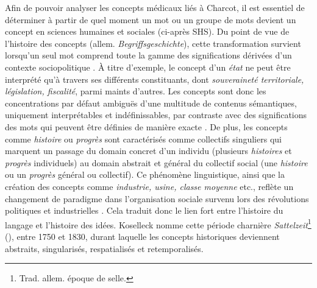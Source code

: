 Afin de pouvoir analyser les concepts médicaux liés à Charcot, il est essentiel de déterminer à partir de quel moment un mot ou un groupe de mots devient un concept en sciences humaines et sociales (ci-après SHS). Du point de vue de l'histoire des concepts (allem. \textit{Begriffsgeschichte}), cette transformation survient lorsqu'un seul mot comprend toute la gamme des significations dérivées d'un contexte sociopolitique \citep[p. 258]{koselleck2011introduction}. À titre d'exemple, le concept d'un \textit{état} ne peut être interprété qu'à travers ses différents constituants, dont \textit{souveraineté territoriale, législation, fiscalité}, parmi maints d'autres. Les concepts sont donc les concentrations par défaut ambiguës d'une multitude de contenus sémantiques, uniquement interprétables et indéfinissables, par contraste avec des significations des mots qui peuvent être définies de manière exacte \citep[p. 20]{koselleck2011introduction}. De plus, les concepts comme \textit{histoire} ou \textit{progrès} sont caractérisés comme \og{}collectifs singuliers\fg{} qui marquent un passage  du domain concret d'un individu (plusieurs \textit{histoires} et \textit{progrès} individuels) au domain abstrait et général du collectif social (une \textit{histoire} ou un \textit{progrès} général ou collectif). Ce phénomène linguistique, ainsi que la création des concepts comme \textit{industrie, usine, classe moyenne} etc., reflète un changement de paradigme dans l'organisation sociale survenu lors des révolutions politiques et industrielles \citep[p. 1]{hobsbawm2010age}. Cela traduit donc le lien fort entre l'histoire du langage et l'histoire des idées. Koselleck nomme cette période charnière \textit{Sattelzeit}\footnote{Trad. allem. \og{}époque de selle\fg{}.} (\citeyear[p. 8]{koselleck2011introduction}), entre 1750 et 1830, durant laquelle les concepts historiques deviennent abstraits, singularisés, respatialisés et retemporalisés.
 
